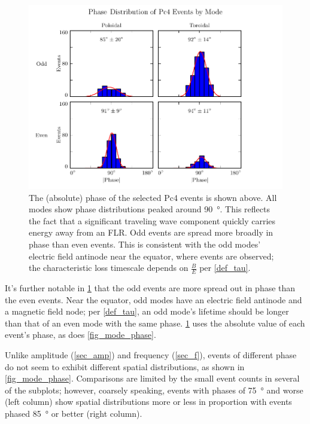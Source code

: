 \begin{figure}[!htb]
    \centering
    \includegraphics[width=\textwidth]{figures/phase.pdf}
    \caption[Phase Distribution of Pc4 Events by Mode]{
      The (absolute) phase of the selected Pc4 events is shown above. All modes show phase distributions peaked around \SI{90}{\degree}. This reflects the fact that a significant traveling wave component quickly carries energy away from an FLR. Odd events are spread more broadly in phase than even events. This is consistent with the odd modes' electric field antinode near the equator, where events are observed; the characteristic loss timescale depends on $\frac{B}{E}$ per \cref{def_tau}. 
    }
    \label{fig_phase}
\end{figure}

It's further notable in \cref{fig_phase} that the odd events are more spread out in phase than the even events. Near the equator, odd modes have an electric field antinode and a magnetic field node; per \cref{def_tau}, an odd mode's lifetime should be longer than that of an even mode with the same phase. \cref{fig_phase} uses the absolute value of each event's phase, as does \cref{fig_mode_phase}. 

Unlike amplitude (\cref{sec_amp}) and frequency (\cref{sec_f}), events of different phase do not seem to exhibit different spatial distributions, as shown in \cref{fig_mode_phase}. Comparisons are limited by the small event counts in several of the subplots; however, coarsely speaking, events with phases of \SI{75}{\degree} and worse (left column) show spatial distributions more or less in proportion with events phased \SI{85}{\degree} or better (right column). 

